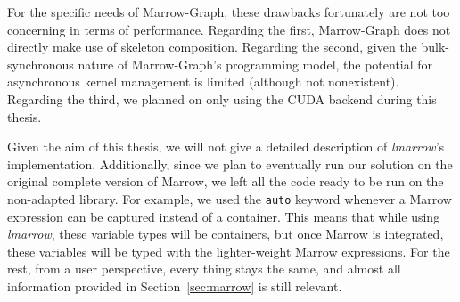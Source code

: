 For the specific needs of Marrow-Graph, these drawbacks fortunately are not too concerning in terms of performance. Regarding the first, Marrow-Graph does not directly make use of skeleton composition. Regarding the second, given the bulk-synchronous nature of Marrow-Graph's programming model, the potential for asynchronous kernel management is limited (although not nonexistent). Regarding the third, we planned on only using the CUDA backend during this thesis.

Given the aim of this thesis, we will not give a detailed description of \textit{lmarrow}'s implementation. Additionally, since we plan to eventually run our solution on the original complete version of Marrow, we left all the code ready to be run on the non-adapted library. For example, we used the \texttt{auto} keyword whenever a Marrow expression can be captured instead of a container. This means that while using \textit{lmarrow}, these variable types will be containers, but once Marrow is integrated, these variables will be typed with the lighter-weight Marrow expressions. For the rest, from a user perspective, every thing stays the same, and almost all information provided in Section~\ref{sec:marrow} is still relevant.